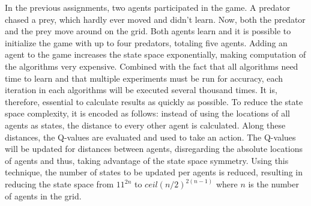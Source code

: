 In the previous assignments, two agents participated in the game. A predator chased a prey, which hardly ever moved and didn't learn. Now, both the predator and the prey move around on the grid. Both agents learn and it is possible to initialize the game with up to four predators, totaling five agents. Adding an agent to the game increases the state space exponentially, making computation of the algorithms very expensive. Combined with the fact that all algorithms need time to learn and that multiple experiments must be run for accuracy, each iteration in each algorithms will be executed several thousand times. It is, therefore, essential to calculate results as quickly as possible. To reduce the state space complexity, it is encoded as follows:  instead of using the locations of all agents as states, the distance to every other agent is calculated. Along these distances, the Q-values are evaluated and used to take an action. The Q-values will be updated for distances between agents, disregarding the absolute locations of agents and thus, taking advantage of the state space symmetry. Using this technique, the number of states to be updated per agents is reduced, resulting in reducing the state space from $11^{2n}$ to $ceil(n/2)^{2(n-1)}$ where $n$ is the number of agents in the grid.
